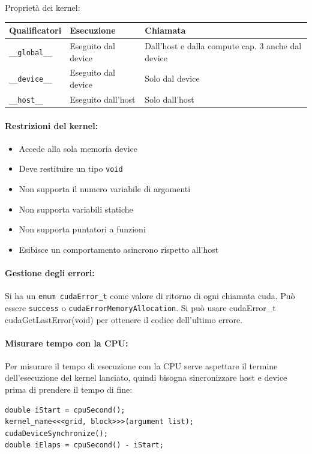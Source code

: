 Proprietà dei kernel: 
\begin{center}
	\begin{tabular}{| l | l | p{4cm} |}
		\hline
		\textbf{Qualificatori} & \textbf{Esecuzione} & \textbf{Chiamata} \\
		\hline
		\texttt{\_\_global\_\_} & Eseguito dal device & Dall’host e dalla compute cap. 3 anche dal device \\
		\hline
		\texttt{\_\_device\_\_} & Eseguito dal device & Solo dal device \\
		\hline
		\texttt{\_\_host\_\_} & Eseguito dall’host & Solo dall’host \\
		\hline
	\end{tabular}
\end{center}

\paragraph{Restrizioni del kernel:}
\begin{itemize}
	\item Accede alla sola memoria device
	
	\item Deve restituire un tipo \texttt{void}
	
	\item Non supporta il numero variabile di argomenti
	
	\item Non supporta variabili statiche
	
	\item Non supporta puntatori a funzioni
	
	\item Esibisce un comportamento asincrono rispetto all'host
\end{itemize}

\paragraph{Gestione degli errori:} Si ha un \texttt{enum cudaError\_t} come valore di ritorno di ogni chiamata cuda. Può essere \texttt{success} o \texttt{cudaErrorMemoryAllocation}. Si può usare {cudaError\_t cudaGetLastError(void)} per ottenere il codice dell'ultimo errore.

\paragraph{Misurare tempo con la CPU:} Per misurare il tempo di esecuzione con la CPU serve aspettare il termine dell'esecuzione del kernel lanciato, quindi bisogna sincronizzare host e device prima di prendere il tempo di fine:
\begin{verbatim}
double iStart = cpuSecond();
kernel_name<<<grid, block>>>(argument list);
cudaDeviceSynchronize();
double iElaps = cpuSecond() - iStart;
\end{verbatim}

